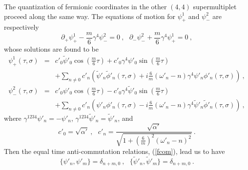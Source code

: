 \documentclass[a4paper,12pt]{article}
\numberwithin{equation}{section}
\begin{document}
The quantization of fermionic coordinates in the other $(4,4)$
supermultiplet proceed along the same way.  The equations of motion
for $\psi^1_+$ and $\psi^2_-$ are respectively
\begin{equation}
\partial_+ \psi^1_+ - \frac{m}{6} \gamma^4 \psi^2_- = 0 ~,~~~
\partial_- \psi^2_- + \frac{m}{6} \gamma^4 \psi^1_+ = 0 ~,
\label{fpeom}
\end{equation}
whose solutions are found to be
\begin{eqnarray}
\psi^1_+ (\tau, \sigma)
 &=& c'_0 \tilde{\psi}'_0 \cos \left( \frac{m}{6} \tau \right)
     + c'_0 \gamma^4 \psi'_0 \sin \left( \frac{m}{6} \tau \right)
                              \nonumber \\
 & & + \sum_{n \neq 0} c'_n
      \left(
         \tilde{\psi}'_n \tilde{\phi}'_n (\tau, \sigma)
         + i \frac{6}{m} (\omega'_n - n)
            \gamma^4 \psi'_n \phi'_n (\tau, \sigma )
      \right)~,
                               \nonumber \\
\psi^2_- (\tau, \sigma)
 &=& c'_0 \psi'_0 \cos \left( \frac{m}{6} \tau \right)
     - c'_0 \gamma^4 \tilde{\psi}'_0
        \sin \left( \frac{m}{6} \tau \right)
                              \nonumber \\
 & & + \sum_{n \neq 0} c'_n
      \left(
         \psi'_n \phi'_n (\tau, \sigma)
         - i \frac{6}{m} (\omega'_n - n)
            \gamma^4 \tilde{\psi}'_n \tilde{\phi}'_n (\tau, \sigma )
      \right)~,
\label{fpmode}
\end{eqnarray}
where $\gamma^{1234} \psi'_n = -\psi'_n$, $\gamma^{1234}
\tilde{\psi}'_n = \tilde{\psi}'_n$, and
\[
c'_0 = \sqrt{\alpha'}~,~~~
c'_n = \frac{\sqrt{\alpha'}}{\sqrt{1 +
          \left( \frac{6}{m} \right)^2 (\omega'_n - n)^2 } }~.
\]
Then the equal time anti-commutation relations, (\ref{fcom}), lead us
to have
\begin{equation}
\{ \psi'_n , \psi'_m \} = \delta_{n+m,0} ~,~~~
\{ \tilde{\psi}'_n, \tilde{\psi}'_m \} = \delta_{n+m,0}~.
\label{fpmcom}
\end{equation}
\end{document}
